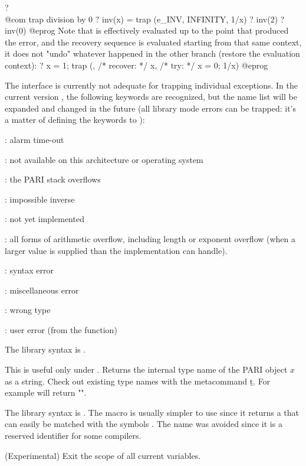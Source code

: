{\bprog
? \\@com trap division by 0
? inv(x) = trap (e_INV, INFINITY, 1/x)
? inv(2)
? inv(0)
@eprog\noindent
Note that  is effectively evaluated up to the point that produced
the error, and the recovery sequence is evaluated starting from that same
context, it does not "undo" whatever happened in the other branch (restore
the evaluation context):
\bprog
? x = 1; trap (, /* recover: */ x, /* try: */ x = 0; 1/x)
@eprog

 The interface is currently not adequate for trapping
individual exceptions. In the current version \vers, the following keywords
are recognized, but the name list will be expanded and changed in the
future (all library mode errors can be trapped: it's a matter of defining
the keywords to ):

: alarm time-out

: not available on this architecture or operating system

: the PARI stack overflows

: impossible inverse

: not yet implemented

: all forms of arithmetic overflow, including length
or exponent overflow (when a larger value is supplied than the
implementation can handle).

: syntax error

: miscellaneous error

: wrong type

: user error (from the  function)

The library syntax is .

\label{se:type}
This is useful only under . Returns the internal type name of
the PARI object $x$ as a  string. Check out existing type names with the
metacommand \b{t}. For example  will return "".

The library syntax is .
The macro  is usually simpler to use since it returns a
 that can easily be matched with the symbols \typ{*}. The name
 was avoided since it is a reserved identifier for some compilers.

\label{se:uninline}
(Experimental) Exit the scope of all current  variables.

}
